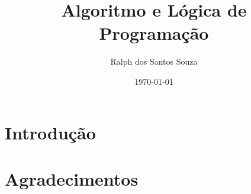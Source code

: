 \documentclass{report}
\title{Algoritmo e Lógica de Programação}
\author{Ralph dos Santos Souza}
\date{\today}
\begin{document}
\maketitle

\tableofcontents

\chapter*{Introdução}
\begin{center}
    
\end{center}

\chapter*{Agradecimentos}
\begin{center}
    
\end{center}

\chapter{}

\chapter{}
\end{document}
